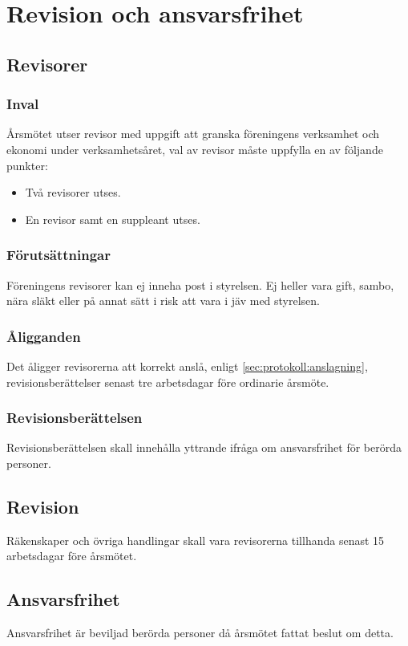 \section{Revision och ansvarsfrihet}
\subsection{Revisorer}
\subsubsection{Inval}
Årsmötet utser revisor med uppgift att granska föreningens verksamhet och ekonomi under verksamhetsåret, val av revisor måste uppfylla en av följande punkter:

\begin{itemize}
	\item Två revisorer utses.
	\item En revisor samt en suppleant utses.
\end{itemize}

\subsubsection{Förutsättningar}
Föreningens revisorer kan ej inneha post i styrelsen. Ej heller vara gift, sambo, nära släkt eller på annat sätt i risk att vara i jäv med styrelsen.

\subsubsection{Åligganden}
Det åligger revisorerna att korrekt anslå, enligt \ref{sec:protokoll:anslagning}, revisionsberättelser senast tre arbetsdagar före ordinarie årsmöte.

\subsubsection{Revisionsberättelsen}
Revisionsberättelsen skall innehålla yttrande ifråga om ansvarsfrihet för berörda personer.

\subsection{Revision}
Räkenskaper och övriga handlingar skall vara revisorerna tillhanda senast 15 arbetsdagar före årsmötet.

\subsection{Ansvarsfrihet}
Ansvarsfrihet är beviljad berörda personer då årsmötet fattat beslut om detta.
